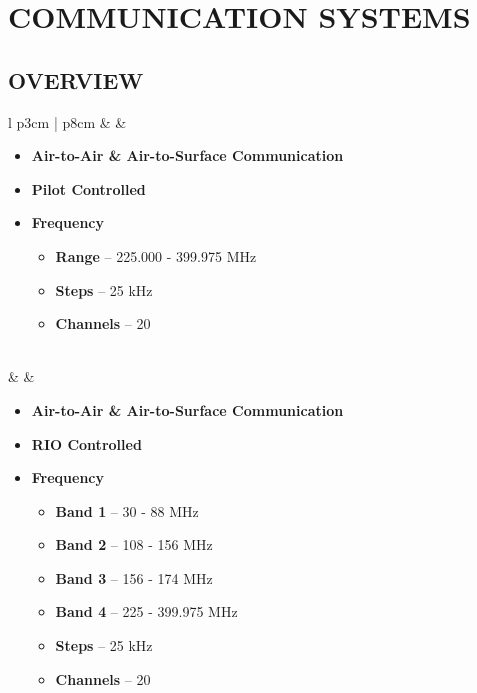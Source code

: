 \documentclass[fontHelvetica]{TechCheck}
\begin{document}
	\cleardoublepage

	\section{COMMUNICATION SYSTEMS}
	\subsection{OVERVIEW}
	\begin{center}
		\begin{longtable}{l p{3cm} | p{8cm}}
			\toprule
			\textbf{\textbullet} &   &
			\begin{minipage}[t]{\linewidth}
				\vspace{-7pt}
				\begin{itemize}
					\item \textbf{Air-to-Air \& Air-to-Surface Communication}
					\item \textbf{Pilot Controlled}
					\item \textbf{Frequency}
					\begin{itemize}
						\item \textbf{Range} -- 225.000 - 399.975 MHz
						\item \textbf{Steps} -- 25 kHz
						\item \textbf{Channels} -- 20
					\end{itemize}
				\end{itemize}
			\end{minipage} \\
			\midrule
			\textbf{\textbullet} &   &
			\begin{minipage}[t]{\linewidth}
				\vspace{-7pt}
				\begin{itemize}
					\item \textbf{Air-to-Air \& Air-to-Surface Communication}
					\item \textbf{RIO Controlled}
					\item \textbf{Frequency}
					\begin{itemize}
						\item \textbf{Band 1} -- 30 - 88 MHz
						\item \textbf{Band 2} -- 108 - 156 MHz
						\item \textbf{Band 3} -- 156 - 174 MHz
						\item \textbf{Band 4} -- 225 - 399.975 MHz
						\item \textbf{Steps} -- 25 kHz
						\item \textbf{Channels} -- 20

\end{itemize}
\end{itemize}
\end{minipage}
\end{longtable}
\end{center}
\end{document}
